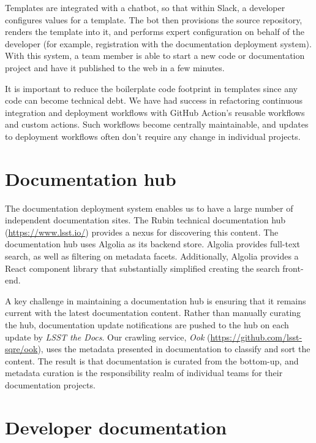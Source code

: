 \documentclass[11pt,twoside]{article}
\begin{document}
Templates are integrated with a chatbot, so that within Slack, a developer configures values for a template.
The bot then provisions the source repository, renders the template into it, and performs expert configuration on behalf of the developer (for example, registration with the documentation deployment system).
With this system, a team member is able to start a new code or documentation project and have it published to the web in a few minutes.

It is important to reduce the boilerplate code footprint in templates since any code can become technical debt.
We have had success in refactoring continuous integration and deployment workflows with GitHub Action's reusable workflows and custom actions.
Such workflows become centrally maintainable, and updates to deployment workflows often don't require any change in individual projects.

\label{sec:hub}
\section{Documentation hub}

The documentation deployment system enables us to have a large number of independent documentation sites.
The Rubin technical documentation hub (\url{https://www.lsst.io/}) provides a nexus for discovering this content.
The documentation hub uses Algolia as its backend store.
Algolia provides full-text search, as well as filtering on metadata facets.
Additionally, Algolia provides a React component library that substantially simplified creating the search front-end.

A key challenge in maintaining a documentation hub is ensuring that it remains current with the latest documentation content.
Rather than manually curating the hub, documentation update notifications are pushed to the hub on each update by \textit{LSST the Docs}.
Our crawling service, \textit{Ook} (\url{https://github.com/lsst-sqre/ook}), uses the metadata presented in documentation to classify and sort the content.
The result is that documentation is curated from the bottom-up, and metadata curation is the responsibility realm of individual teams for their documentation projects.


\section{Developer documentation}
\end{document}
